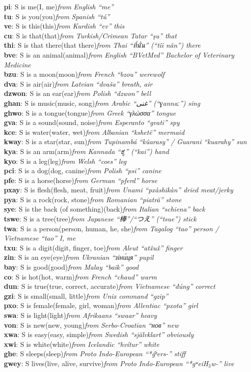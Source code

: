 \documentclass{article}
\newcommand{\dfn}[4]{\noindent\textbf{#1}: #2\quad(#3)\hfill\emph{#4}\\}
\begin{document}
\dfn{pi}{S is me}{I, me}{from English ``me''}
\dfn{tu}{S is you}{you}{from Spanish ``tú''}
\dfn{ve}{S is this}{this}{from Kurdish ``ev'' this}
\dfn{cu}{S is that}{that}{from Turkish/Crimean Tatar ``şu'' that}
\dfn{thi}{S is that there}{that there}{from Thai ``{\thaifont ที่นั่น}'' (``tîi nân'') there}

\dfn{bve}{S is an animal}{animal}{from English ``BVetMed'' Bachelor of Veterinary Medicine}
\dfn{bzu}{S is a moon}{moon}{from French ``bzou'' werewolf}
\dfn{dva}{S is air}{air}{from Latvian ``dvaša'' breath, air}
\dfn{dzwon}{S is an ear}{ear}{from Polish ``dzwon'' bell}
\dfn{ghan}{S is music}{music, song}{from Arabic ``{\arabicfont غنى}'' (``ɣannaː'') sing}
\dfn{ghwo}{S is a tongue}{tongue}{from Greek ``γλώσσα'' tongue}
\dfn{gva}{S is a sound}{sound, noise}{from Esperanto ``gvati'' spy}
\dfn{kce}{S is water}{water, wet}{from Albanian ``kshetë'' mermaid}
\dfn{kway}{S is a star}{star, sun}{from Tupinambá ``kûarasy'' / Guarani ``kuarahy'' sun}
\dfn{kya}{S is an arm}{arm}{from Kannada ``{\kannadafont ಕೈ}'' (``kai'') hand}
\dfn{kyo}{S is a leg}{leg}{from Welsh ``coes'' leg}
\dfn{pci}{S is a dog}{dog, canine}{from Polish ``psi'' canine}
\dfn{pfe}{S is a horse}{horse}{from German ``pferd'' horse}
\dfn{pxay}{S is flesh}{flesh, meat, fruit}{from Unami ``pxàshikàn'' dried meat/jerky}
\dfn{pya}{S is a rock}{rock, stone}{from Romanian ``piatră'' stone}
\dfn{sye}{S is the back (of something)}{back}{from Italian ``schiena'' back}
\dfn{tswe}{S is a tree}{tree}{from Japanese ``棒''/``つえ'' (``tsue'') stick}
\dfn{twa}{S is a person}{person, human, he, she}{from Tagalog ``tao'' person / Vietnamese ``tao'' I, me}
\dfn{txu}{S is a digit}{digit, finger, toe}{from Aleut ``atx̂ux̂'' finger}
\dfn{zin}{S is an eye}{eye}{from Ukranian ``зіни́ця'' pupil}

\dfn{bay}{S is good}{good}{from Malay ``baik'' good}
\dfn{co}{S is hot}{hot, warm}{from French ``chaud'' warm}
\dfn{dun}{S is true}{true, correct, accurate}{from Vietnamese ``đúng'' correct}
\dfn{gzi}{S is small}{small, little}{from Unix command ``gzip''}
\dfn{pxo}{S is female}{female, girl, woman}{from Allentiac ``pxota'' girl}
\dfn{swa}{S is light}{light}{from Afrikaans ``swaar'' heavy}
\dfn{von}{S is new}{new, young}{from Serbo-Croatian ``нов'' new}
\dfn{xwa}{S is easy}{easy, simple}{from Swedish ``självklart'' obviously}
\dfn{xwi}{S is white}{white}{from Icelandic ``hvítur'' white}

\dfn{ghe}{S sleeps}{sleep}{from Proto Indo-European ``*ǵʰers-'' stiff}
\dfn{gwey}{S lives}{live, alive, survive}{from Proto Indo-European ``*gʷeiH$_{\mathit{3}}$w-'' live}
\end{document}
